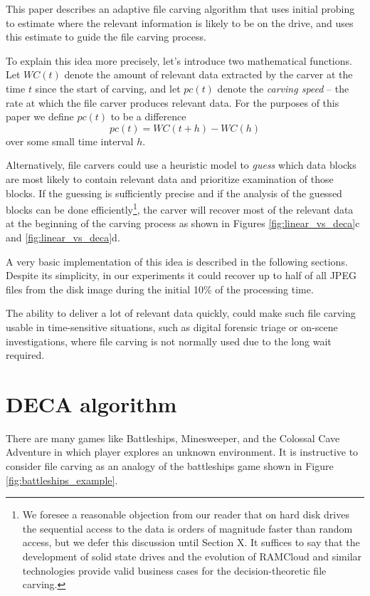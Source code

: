 \documentclass[10pt,a4paper]{article}
\begin{document}
This paper describes an adaptive file carving algorithm that uses initial probing to estimate where the relevant information is likely to be on the drive, and uses this estimate to guide the file carving process.

To explain this idea more precisely, let's introduce two mathematical functions. Let $WC(t)$ denote the amount of relevant data extracted by the carver at the time $t$ since the start of carving, and let $pc(t)$ denote the \emph{carving speed} -- the rate at which the file carver produces relevant data. For the purposes of this paper we define $pc(t)$ to be a difference
\begin{equation}
    pc(t) = WC(t+h) - WC(h)
\end{equation}
over some small time interval $h$.

Alternatively, file carvers could use a heuristic model to \emph{guess} which data blocks are most likely to contain relevant data and prioritize examination of those blocks. If the guessing is sufficiently precise and if the analysis of the guessed blocks can be done efficiently\footnote{We foresee a reasonable objection from our reader that on hard disk drives the sequential access to the data is orders of magnitude faster than random access, but we defer this discussion until Section X. It suffices to say that the development of solid state drives and the evolution of RAMCloud \cite{ousterhout2010case} and similar technologies provide valid business cases for the decision-theoretic file carving.}, the carver will recover most of the relevant data at the beginning of the carving process as shown in Figures \ref{fig:linear_vs_deca}c and \ref{fig:linear_vs_deca}d.

A very basic implementation of this idea is described in the following sections. Despite its simplicity, in our experiments it could recover up to half of all JPEG files from the disk image during the initial 10\% of the processing time. 

The ability to deliver a lot of relevant data quickly, could make such file carving usable in time-sensitive situations, such as digital forensic triage or on-scene investigations, where file carving is not normally used due to the long wait required. 

\section{DECA algorithm}

There are many games like Battleships, Minesweeper, and the Colossal Cave Adventure in which player explores an unknown environment. It is instructive to consider file carving as an analogy of the battleships game shown in Figure \ref{fig:battleships_example}. 
\end{document}
